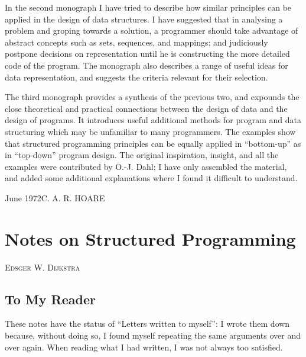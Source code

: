 \documentclass[twoside,11pt]{book}
\renewcommand{\chaptermark}[1]{\markboth{#1}{}}
\renewcommand{\chaptermark}[1]{\markboth{#1}{}}
\begin{document}
In the second monograph I have tried to describe how similar principles can be applied in the design of data structures. I have suggested that in analysing a problem and groping towards a solution, a programmer should take advantage of abstract concepts such as sets, sequences, and mappings; and judiciously postpone decisions on representation until he is constructing the more detailed code of the program. The monograph also describes a range of useful ideas for data representation, and suggests the criteria relevant for their selection.

The third monograph provides a synthesis of the previous two, and expounds the close theoretical and practical connections between the design of data and the design of programs. It introduces useful additional methods for program and data structuring which may be unfamiliar to many programmers. The examples show that structured programming principles can be equally applied in ``bottom-up'' as in ``top-down'' program design. The original inspiration, insight, and all the examples were contributed by O.-J. Dahl; I have only assembled the material, and added some additional explanations where I found it difficult to understand.
\bigskip
 
\noindent
June 1972\hfill C. A. R. HOARE
\clearpage
\tableofcontents

\mainmatter

\cleardoublepage
{}

\pagestyle{myheadings}

\renewcommand{\chaptermark}[1]{\markright{\scriptsize\normalfont\hfill \uppercase{#1}\hfill}{} }

\clearpage
\chapter{Notes on Structured Programming}

{
	\noindent
	\scshape\hfill\scriptsize Edsger W. Dijkstra\hfill
}
\renewcommand{\leftmark}{\normalfont\scriptsize\hfill E. W. DIJKSTRA\hfill}
\medskip

\section[To my reader]{To My Reader}

These notes have the status of ``Letters written to myself'': I wrote them down because, without doing so, I found myself repeating the same arguments over and over again. When reading what I had written, I was not always too satisfied.
\end{document}
